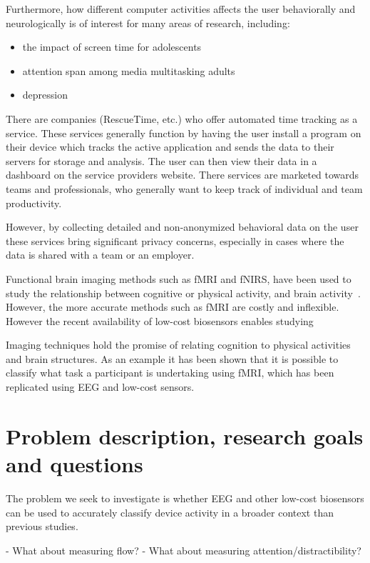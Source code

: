 \documentclass{IEEEtran}
\begin{document}
Furthermore, how different computer activities affects the user behaviorally and neurologically is of interest for many areas of research, including:

\begin{itemize}
  \item the impact of screen time for adolescents~\cite{TODO}
  \item attention span among media multitasking adults~\cite{TODO}
  \item depression
\end{itemize}

There are companies (RescueTime, etc.) who offer automated time tracking as a service. These services generally function by having the user install a program on their device which tracks the active application and sends the data to their servers for storage and analysis. The user can then view their data in a dashboard on the service providers website. There services are marketed towards teams and professionals, who generally want to keep track of individual and team productivity.

However, by collecting detailed and non-anonymized behavioral data on the user these services bring significant privacy concerns, especially in cases where the data is shared with a team or an employer.


Functional brain imaging methods such as fMRI and fNIRS, have been used to study the relationship between cognitive or physical activity, and brain activity~\cite{floyd_decoding_2017}\cite{hong_classification_2015}. However, the more accurate methods such as fMRI are costly and inflexible. However the recent availability of low-cost biosensors enables studying


Imaging techniques hold the promise of relating cognition to physical activities and brain structures. As an example it has been shown that it is possible to classify what task a participant is undertaking using fMRI\cite{floyd_decoding_2017}, which has been replicated using EEG and low-cost sensors\cite{fucci_replication_2019}.



\section{Problem description, research goals and questions}
\begin{markdown}

The problem we seek to investigate is whether EEG and other low-cost biosensors can be used to accurately classify device activity in a broader context than previous studies.

 - What about measuring flow?
 - What about measuring attention/distractibility?

\end{markdown}
\end{document}
